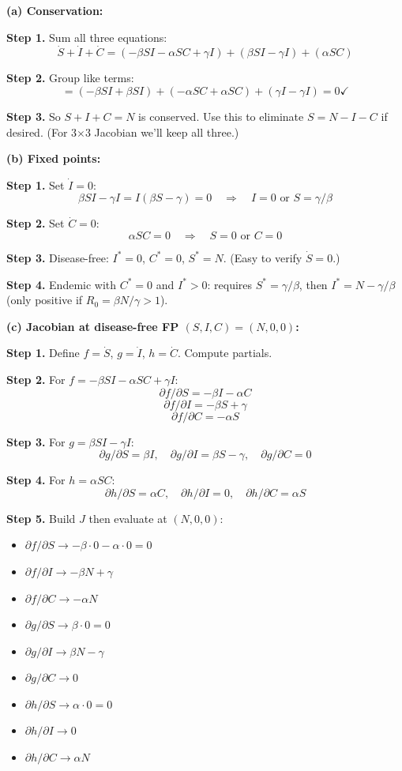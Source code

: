 \documentclass[10pt]{article}
\newcommand{\thus}{\quad\Longrightarrow\quad}
\begin{document}
\begin{solution}
\textbf{(a) Conservation:}

\textbf{Step 1.} Sum all three equations:
\[
\dot S + \dot I + \dot C = (-\beta SI - \alpha SC + \gamma I) + (\beta SI - \gamma I) + (\alpha SC)
\]

\textbf{Step 2.} Group like terms:
\[
= (-\beta SI + \beta SI) + (-\alpha SC + \alpha SC) + (\gamma I - \gamma I) = 0 \checkmark
\]

\textbf{Step 3.} So $S + I + C = N$ is conserved. Use this to eliminate $S = N - I - C$ if desired. (For 3$\times$3 Jacobian we'll keep all three.)

\medskip\textbf{(b) Fixed points:}

\textbf{Step 1.} Set $\dot I = 0$:
\[
\beta SI - \gamma I = I(\beta S - \gamma) = 0 \thus I = 0 \text{ or } S = \gamma/\beta
\]

\textbf{Step 2.} Set $\dot C = 0$:
\[
\alpha SC = 0 \thus S = 0 \text{ or } C = 0
\]

\textbf{Step 3.} Disease-free: $I^* = 0$, $C^* = 0$, $S^* = N$. (Easy to verify $\dot S = 0$.)

\textbf{Step 4.} Endemic with $C^* = 0$ and $I^* > 0$: requires $S^* = \gamma/\beta$, then $I^* = N - \gamma/\beta$ (only positive if $R_0 = \beta N/\gamma > 1$).

\medskip\textbf{(c) Jacobian at disease-free FP $(S, I, C) = (N, 0, 0)$:}

\textbf{Step 1.} Define $f = \dot S$, $g = \dot I$, $h = \dot C$. Compute partials.

\textbf{Step 2.} For $f = -\beta SI - \alpha SC + \gamma I$:
\[
\partial f/\partial S = -\beta I - \alpha C
\]
\[
\partial f/\partial I = -\beta S + \gamma
\]
\[
\partial f/\partial C = -\alpha S
\]

\textbf{Step 3.} For $g = \beta SI - \gamma I$:
\[
\partial g/\partial S = \beta I, \quad \partial g/\partial I = \beta S - \gamma, \quad \partial g/\partial C = 0
\]

\textbf{Step 4.} For $h = \alpha SC$:
\[
\partial h/\partial S = \alpha C, \quad \partial h/\partial I = 0, \quad \partial h/\partial C = \alpha S
\]

\textbf{Step 5.} Build $J$ then evaluate at $(N, 0, 0)$:
\begin{itemize}
\item $\partial f/\partial S \to -\beta\cdot 0 - \alpha\cdot 0 = 0$
\item $\partial f/\partial I \to -\beta N + \gamma$
\item $\partial f/\partial C \to -\alpha N$
\item $\partial g/\partial S \to \beta\cdot 0 = 0$
\item $\partial g/\partial I \to \beta N - \gamma$
\item $\partial g/\partial C \to 0$
\item $\partial h/\partial S \to \alpha\cdot 0 = 0$
\item $\partial h/\partial I \to 0$
\item $\partial h/\partial C \to \alpha N$
\end{itemize}


\end{solution}
\end{document}
